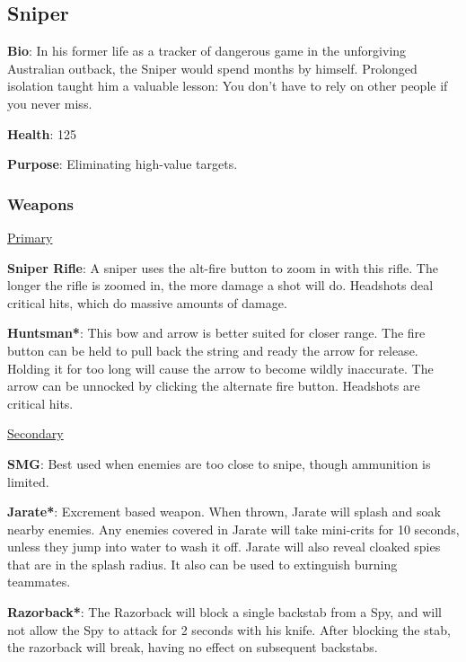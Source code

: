 \subsection{Sniper}
\label{Sniper}
{\bf Bio}:
In his former life as a tracker of dangerous game in the unforgiving Australian outback, the Sniper would spend months by himself. Prolonged isolation taught him a valuable lesson: You don't have to rely on other people if you never miss.

{\bf Health}: 125

{\bf Purpose}:
Eliminating high-value targets.

\subsubsection {Weapons}

\begin {center}
\underline {Primary}
\end {center}

{\bf Sniper Rifle}: A sniper uses the alt-fire button to zoom in with this rifle. The longer the rifle is zoomed in, the more damage a shot will do. Headshots deal critical hits, which do massive amounts of damage.

{\bf Huntsman*}: This bow and arrow is better suited for closer range. The fire button can be held to pull back the string and ready the arrow for release. Holding it for too long will cause the arrow to become wildly inaccurate. The arrow can be unnocked by clicking the alternate fire button. Headshots are critical hits.

\begin {center}
\underline {Secondary}
\end {center}

{\bf SMG}: Best used when enemies are too close to snipe, though ammunition is limited.

{\bf Jarate*}: Excrement based weapon. When thrown, Jarate will splash and soak nearby enemies. Any enemies covered in Jarate will take mini-crits for 10 seconds, unless they jump into water to wash it off. Jarate will also reveal cloaked spies that are in the splash radius. It also can be used to extinguish burning teammates. 

{\bf Razorback*}: The Razorback will block a single backstab from a Spy, and will not allow the Spy to attack for 2 seconds with his knife. After blocking the stab, the razorback will break, having no effect on subsequent backstabs.

